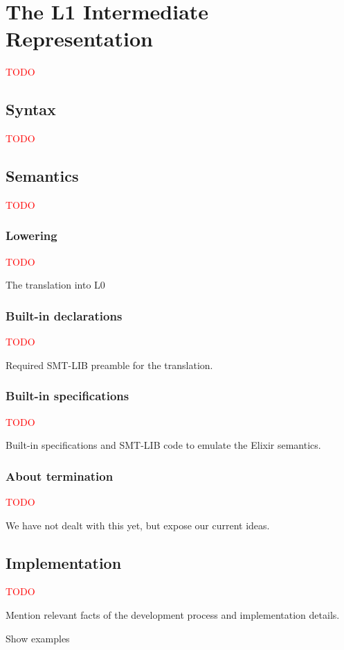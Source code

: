 \chapter{The L1 Intermediate Representation}
\label{cap:intermediateRepresentation}

\textcolor{red}{TODO}

\section{Syntax}

\textcolor{red}{TODO}

\section{Semantics}

\textcolor{red}{TODO}

\subsection{Lowering}

\textcolor{red}{TODO}

The translation into L0

\subsection{Built-in declarations}

\textcolor{red}{TODO}

Required SMT-LIB preamble for the translation.

\subsection{Built-in specifications}

\textcolor{red}{TODO}

Built-in specifications and SMT-LIB code to emulate the 
Elixir semantics.

\subsection{About termination}

\textcolor{red}{TODO}

We have not dealt with this yet, but expose our current ideas.

\section{Implementation}

\textcolor{red}{TODO}

Mention relevant facts of the development process and implementation details.

Show examples
